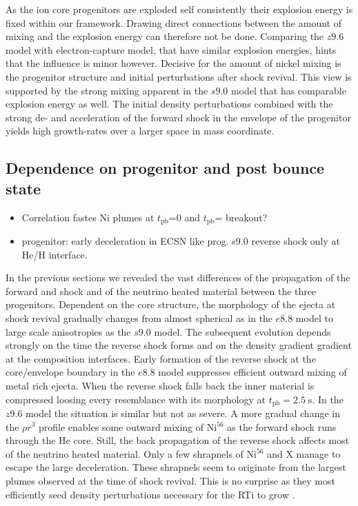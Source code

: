 \documentclass[fleqn,usenatbib]{mnras}
\newcommand{\tpb}{\ensuremath{t_{\text{pb}}}}
\newcommand{\nickel}{$\mathrm{Ni^{56}}$\xspace}
\newcommand{\tracer}{$\mathrm{X}$\xspace}
\renewcommand{\sec}{\xspace\ensuremath{\mathrm{s}}}
\newcommand{\COM}[1]{{\color{red}#1}}
\begin{document}
As the ion core progenitors are exploded self consistently their explosion energy is fixed within our framework. Drawing direct connections between the amount of mixing and the explosion energy can therefore not be done. Comparing the $z9.6$ model with electron-capture model, that have similar explosion energies, hints that the influence is minor however. Decisive for the amount of nickel mixing is the progenitor structure and initial perturbations after shock revival. This view is supported by the strong mixing apparent in the $s9.0$ model that has comparable explosion energy as well. The initial density perturbations combined with the strong de- and acceleration of the forward shock in the envelope of the progenitor yields high growth-rates over a larger space in mass coordinate. 


\subsection{Dependence on progenitor and post bounce state}
\COM{
\begin{itemize}
    \item Correlation fastes Ni plumes at \tpb=0 and \tpb= breakout?
    \item progenitor: early deceleration in ECSN like prog. s9.0 reverse shock only at He/H interface. 
\end{itemize}
}
In the previous sections we revealed the vast differences of the propagation of the forward and shock and of the neutrino heated material between the three progenitors. 
Dependent on the core structure, the morphology of the ejecta at shock revival gradually changes from  almost spherical as in the $e8.8$ model to large scale anisotropies as the $s9.0$ model.
The subsequent evolution depends strongly on the time the reverse shock forms and on the density gradient gradient at the composition interfaces.
Early formation of the reverse shock at the core/envelope boundary in the $e8.8$ model suppresses efficient outward mixing of metal rich ejecta. When the reverse shock falls back the inner material is compressed loosing every resemblance with its morphology at $\tpb=2.5\;\sec$.
In the $z9.6$ model the situation is similar but not as severe. A more gradual change in the $\rho r^3$ profile enables some outward mixing of \nickel as the forward shock runs through the He core. Still, the back propagation of the reverse shock affects most of the neutrino heated material. Only a few shrapnels of \nickel and \tracer manage to escape the large deceleration. These shrapnels seem to originate from the largest plumes observed at the time of shock revival. This is no surprise as they most efficiently seed density perturbations necessary for the RTi to grow \citep{Wongwathanarat2015}.
\end{document}

